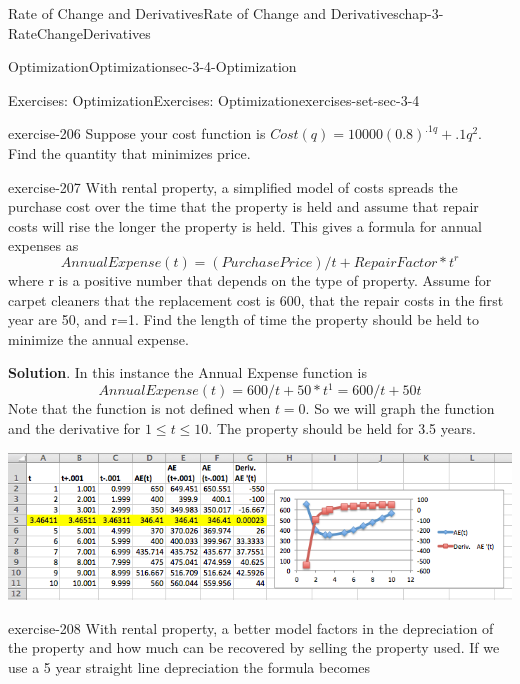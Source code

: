 \documentclass[oneside,10pt,]{book}
\numberwithin{equation}{section}
\begin{document}
\begin{chapterptx}{Rate of Change and Derivatives}{}{Rate of Change and Derivatives}{}{}{chap-3-RateChangeDerivatives}
\begin{sectionptx}{Optimization}{}{Optimization}{}{}{sec-3-4-Optimization}
\begin{exercises-subsection-numberless}{Exercises: Optimization}{}{Exercises: Optimization}{}{}{exercises-set-sec-3-4}
\begin{divisionexercise}{16}{}{}{exercise-206}%
\hypertarget{p-1314}{}%
Suppose your cost function is \(Cost(q)=10000(0.8)^{.1q}+.1q^2\).  Find the quantity that minimizes price.%
\end{divisionexercise}%
\begin{divisionexercise}{17}{}{}{exercise-207}%
\hypertarget{p-1315}{}%
With rental property, a simplified model of costs spreads the purchase cost over the time that the property is held and assume that repair costs will rise the longer the property is held.  This gives a formula for annual expenses as%
\begin{equation*}
AnnualExpense(t)=(PurchasePrice)/t+RepairFactor*t^r
\end{equation*}
where r is a positive number that depends on the type of property.  Assume for carpet cleaners that the replacement cost is \textdollar{}600, that the repair costs in the first year are \textdollar{}50, and r=1.  Find the length of time the property should be held to minimize the annual expense.%
\par\smallskip%
\noindent\textbf{Solution}.\hypertarget{solution-103}{}\quad%
\hypertarget{p-1316}{}%
In this instance the Annual Expense function is%
%
\begin{equation*}
AnnualExpense(t)=600/t+50*t^1=600/t+50t
\end{equation*}
\hypertarget{p-1317}{}%
Note that the function is not defined when \(t = 0\). So we will graph the function and the derivative for \(1 \le t \le 10\). The property should be held for 3.5 years.%
\begin{sidebyside}{1}{0.1}{0.1}{0}%
\begin{sbspanel}{0.8}%
\includegraphics[width=1\linewidth]{images/sec3-4-sol17a.png}
\end{sbspanel}%
\end{sidebyside}%
\end{divisionexercise}%
\begin{divisionexercise}{18}{}{}{exercise-208}%
\hypertarget{p-1318}{}%
With rental property, a better model factors in the depreciation of the property and how much can be recovered by selling the property used.  If we use a 5 year straight line depreciation the formula becomes%

\end{divisionexercise}
\end{exercises-subsection-numberless}
\end{sectionptx}
\end{chapterptx}
\end{document}
